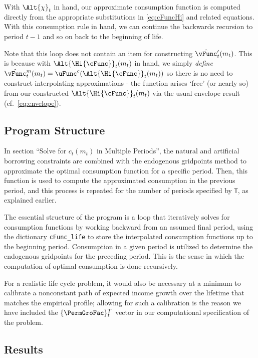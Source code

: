\documentclass[titlepage, headings=optiontotocandhead]{\econtex}
\begin{document}
With $\Alt{\chi}_{t}$ in hand, our approximate consumption function
is computed directly from the appropriate substitutions in \eqref{eq:cFuncHi}
and related equations.  With this consumption
rule in hand, we can continue the backwards recursion to period $t-1$
and so on back to the beginning of life.

Note that this loop does not contain an item for constructing $\hat{\vFunc}_{t}^{\prime}({m}_{t})$. This is because with $\Alt{\Hi{\cFunc}}_{t}({m}_{t})$ in hand, we simply \textit{define} $\hat{\vFunc}^{{m}}_{t}({m}_{t}) = \uFunc^{{c}}(\Alt{\Hi{\cFunc}}_{t}({m}_{t}))$ so there is no need to construct interpolating approximations - the function arises `free' (or nearly so) from our constructed $\Alt{\Hi{\cFunc}}_{t}({m}_{t})$ via the usual envelope result (cf.\ \eqref{eq:envelope}).

\subsection{Program Structure}

In section ``Solve for $c_t(m_t)$ in Multiple Periods'', the natural and artificial borrowing constraints are combined with the endogenous gridpoints method to approximate the optimal consumption function for a specific period. Then, this function is used to compute the approximated consumption in the previous period, and this process is repeated for the number of periods specified by \texttt{T}, as explained earlier.

The essential structure of the program is a loop that iteratively solves for consumption functions by working backward from an assumed final period, using the dictionary \texttt{cFunc\_life} to store the interpolated consumption functions up to the beginning period. Consumption in a given period is utilized to determine the endogenous gridpoints for the preceding period. This is the sense in which the computation of optimal consumption is done recursively.

For a realistic life cycle problem, it would also be necessary at a
minimum to calibrate a nonconstant path of expected income growth over the
lifetime that matches the empirical profile; allowing for such
a calibration is the reason we have included the $\{\PermGroFac\}_{t}^{T}$
vector in our computational specification of the problem.

\hypertarget{Results}{}
\subsection{Results}
\end{document}
